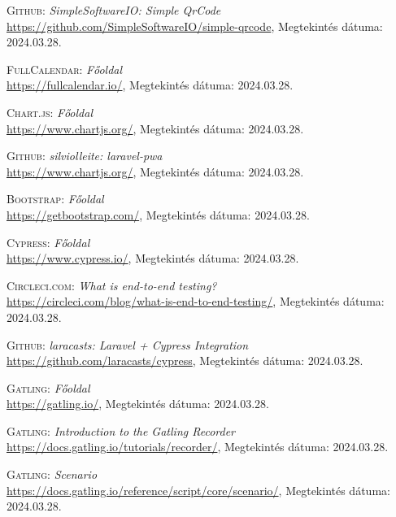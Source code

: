 \documentclass[
]{thesis-ekf}
\theoremstyle{definition}
\theoremstyle{remark}
\begin{document}
\begin{thebibliography}{19}
\textsc{Github}: \emph{SimpleSoftwareIO: Simple QrCode}
\\
\url{https://github.com/SimpleSoftwareIO/simple-qrcode}, Megtekintés dátuma: 2024.03.28.

\textsc{FullCalendar}: \emph{Főoldal}
\\
\url{https://fullcalendar.io/}, Megtekintés dátuma: 2024.03.28.

\textsc{Chart.js}: \emph{Főoldal}
\\
\url{https://www.chartjs.org/}, Megtekintés dátuma: 2024.03.28.

\textsc{Github}: \emph{silviolleite: laravel-pwa}
\\
\url{https://www.chartjs.org/}, Megtekintés dátuma: 2024.03.28.

\textsc{Bootstrap}: \emph{Főoldal}
\\
\url{https://getbootstrap.com/}, Megtekintés dátuma: 2024.03.28.

\textsc{Cypress}: \emph{Főoldal}
\\
\url{https://www.cypress.io/}, Megtekintés dátuma: 2024.03.28.

\textsc{Circleci.com}: \emph{What is end-to-end testing?}
\\
\url{https://circleci.com/blog/what-is-end-to-end-testing/}, Megtekintés dátuma: 2024.03.28.

\textsc{Github}: \emph{laracasts: Laravel + Cypress Integration}
\\
\url{https://github.com/laracasts/cypress}, Megtekintés dátuma: 2024.03.28.

\textsc{Gatling}: \emph{Főoldal}
\\
\url{https://gatling.io/}, Megtekintés dátuma: 2024.03.28.

\textsc{Gatling}: \emph{Introduction to the Gatling Recorder}
\\
\url{https://docs.gatling.io/tutorials/recorder/}, Megtekintés dátuma: 2024.03.28.

\textsc{Gatling}: \emph{Scenario}
\\
\url{https://docs.gatling.io/reference/script/core/scenario/}, Megtekintés dátuma: 2024.03.28.


\end{thebibliography}


\end{document}
